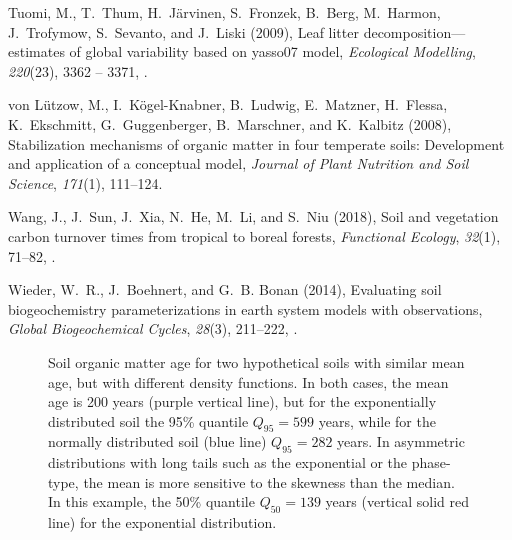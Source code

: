 \documentclass[draft,linenumbers]{agujournal}
\begin{document}
\begin{thebibliography}{41}
Tuomi, M., T.~Thum, H.~J{\"a}rvinen, S.~Fronzek, B.~Berg, M.~Harmon,
  J.~Trofymow, S.~Sevanto, and J.~Liski (2009), Leaf litter
  decomposition---estimates of global variability based on yasso07 model,
  \textit{Ecological Modelling}, \textit{220}(23), 3362 -- 3371,
  .

von L{\"u}tzow, M., I.~K{\"o}gel-Knabner, B.~Ludwig, E.~Matzner, H.~Flessa,
  K.~Ekschmitt, G.~Guggenberger, B.~Marschner, and K.~Kalbitz (2008),
  Stabilization mechanisms of organic matter in four temperate soils:
  Development and application of a conceptual model, \textit{Journal of Plant
  Nutrition and Soil Science}, \textit{171}(1), 111--124.

Wang, J., J.~Sun, J.~Xia, N.~He, M.~Li, and S.~Niu (2018), Soil and vegetation
  carbon turnover times from tropical to boreal forests, \textit{Functional
  Ecology}, \textit{32}(1), 71--82, .

Wieder, W.~R., J.~Boehnert, and G.~B. Bonan (2014), Evaluating soil
  biogeochemistry parameterizations in earth system models with observations,
  \textit{Global Biogeochemical Cycles}, \textit{28}(3), 211--222,
  .

\end{thebibliography}

\newpage


\begin{figure}[t]
   \centering
   \caption{Soil organic matter age for two hypothetical soils with similar mean age, but with different density functions. In both cases, the mean age is 200 years (purple vertical line), but for the exponentially distributed soil the 95\% quantile $Q_{95} = 599$ years, while for the normally distributed soil (blue line) $Q_{95} = 282$ years. In asymmetric distributions with long tails such as the exponential or the phase-type, the mean is more sensitive to the skewness than the median. In this example, the 50\% quantile $Q_{50} = 139$ years (vertical solid red line) for the exponential distribution.}
   \label{fig:example}
\end{figure}
\end{document}
